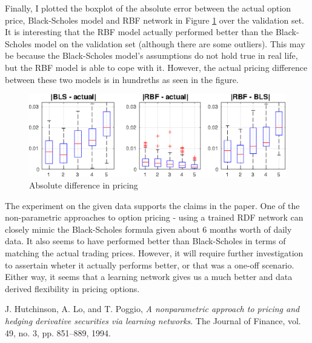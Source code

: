\documentclass[11pt, fleqn]{article}
\begin{document}
Finally, I plotted the boxplot of the absolute error between the actual option price, Black-Scholes model and RBF network in Figure \ref{fig:q1-bls-vs-rbf} over the validation set. It is interesting that the RBF model actually performed better than the Black-Scholes model on the validation set (although there are some outliers). This may be because the Black-Scholes model's assumptions do not hold true in real life, but the RBF model is able to cope with it. However, the actual pricing difference between these two models is in hundreths as seen in the figure.

\begin{figure}[!h]
\begin{center}
	\includegraphics[scale=.65] {q1_bls_vs_rbf.eps}
	\caption{Absolute difference in pricing}
	\label{fig:q1-bls-vs-rbf}
\end{center}
\end{figure}

The experiment on the given data supports the claims in the paper. One of the non-parametric approaches to option pricing - using a trained RDF network can closely mimic the Black-Scholes formula given about 6 months worth of daily data. It also seems to have performed better than Black-Scholes in terms of matching the actual trading prices. However, it will require further investigation to assertain wheter it actually performs better, or that was a one-off scenario. Either way, it seems that a learning network gives us a much better and data derived flexibility in pricing options.

\begin{thebibliography}{9}
J. Hutchinson, A. Lo, and T. Poggio,
\textit{A nonparametric  approach  to  pricing  and  hedging  derivative
securities via learning networks}. 
The Journal of Finance, vol. 49, no. 3, pp. 851–889, 1994.

\end{thebibliography}
\end{document}
